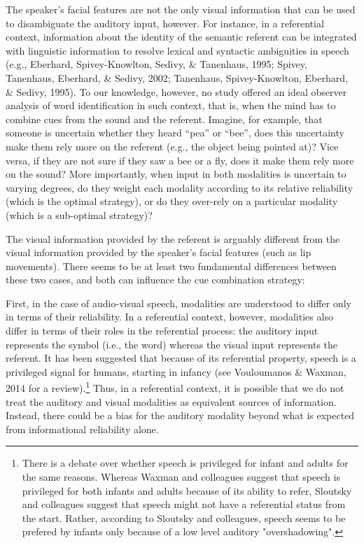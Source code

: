 \documentclass[english,man]{apa6}
\theoremstyle{definition}
\theoremstyle{definition}
\theoremstyle{definition}
\theoremstyle{remark}
\begin{document}
The speaker's facial features are not the only visual information that
can be used to disambiguate the auditory input, however. For instance,
in a referential context, information about the identity of the semantic
referent can be integrated with linguistic information to resolve
lexical and syntactic ambiguities in speech (e.g., Eberhard,
Spivey-Knowlton, Sedivy, \& Tanenhaus, 1995; Spivey, Tanenhaus,
Eberhard, \& Sedivy, 2002; Tanenhaus, Spivey-Knowlton, Eberhard, \&
Sedivy, 1995). To our knowledge, however, no study offered an ideal
observer analysis of word identification in such context, that is, when
the mind has to combine cues from the sound and the referent. Imagine,
for example, that someone is uncertain whether they heard \enquote{pea}
or \enquote{bee}, does this uncertainty make them rely more on the
referent (e.g., the object being pointed at)? Vice versa, if they are
not sure if they saw a bee or a fly, does it make them rely more on the
sound? More importantly, when input in both modalities is uncertain to
varying degrees, do they weight each modality according to its relative
reliability (which is the optimal strategy), or do they over-rely on a
particular modality (which is a sub-optimal strategy)?

The visual information provided by the referent is arguably different
from the visual information provided by the speaker's facial features
(such as lip movements). There seems to be at least two fundamental
differences between these two cases, and both can influence the cue
combination strategy:

First, in the case of audio-visual speech, modalities are understood to
differ only in terms of their reliability. In a referential context,
however, modalities also differ in terms of their roles in the
referential process: the auditory input represents the symbol (i.e., the
word) whereas the visual input represents the referent. It has been
suggested that because of its referential property, speech is a
privileged signal for humans, starting in infancy (see Vouloumanos \&
Waxman, 2014 for a
review).\footnote{There is a debate over whether speech is privileged for infant and adults for the same reasons. Whereas Waxman and colleagues suggest that speech is privileged for both infants and adults because of its ability to refer, Sloutsky and colleagues suggest that speech might not have a referential status from the start. Rather, according to Sloutsky and colleagues, speech seems to be prefered by infants only because of a low level auditory "overshadowing".}
Thus, in a referential context, it is possible that we do not treat the
auditory and visual modalities as equivalent sources of information.
Instead, there could be a bias for the auditory modality beyond what is
expected from informational reliability alone.
\end{document}
